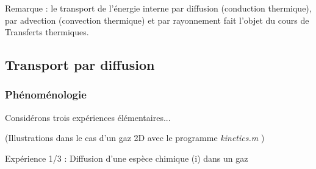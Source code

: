 {\begin{frame}{\insertsubsubsectionhead}
\begin{itemize}[<+-| alert@+>]
\end{itemize}

\bigskip

\pause

Remarque : le transport de l'énergie interne par diffusion (conduction thermique), par advection (convection thermique) et par rayonnement fait l'objet du cours de Transferts thermiques.

\vspace{0mm}

\end{frame}

\subsection{Transport par diffusion}

\subsubsection{Phénoménologie}

\begin{frame}{\insertsubsubsectionhead}

\large

Considérons trois expériences élémentaires...

\bigskip



(Illustrations dans le cas d'un gaz 2D avec le programme {\sl kinetics.m} ) 

\bigskip


\vspace{30mm}

\end{frame}

\begin{frame}{Expérience 1/3 : Diffusion d'une espèce chimique (i) dans un gaz}



\end{frame}}
